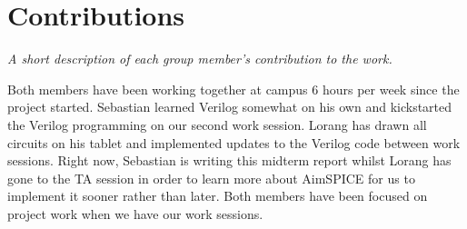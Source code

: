 \section{Contributions}
\textit{A short description of each group member’s contribution to the work.}

Both members have been working together at campus 6 hours per week since the project started. Sebastian learned Verilog somewhat on his own and kickstarted the Verilog programming on our second work session. Lorang has drawn all circuits on his tablet and implemented updates to the Verilog code between work sessions. Right now, Sebastian is writing this midterm report whilst Lorang has gone to the TA session in order to learn more about AimSPICE for us to implement it sooner rather than later. Both members have been focused on project work when we have our work sessions.